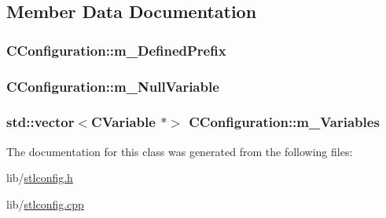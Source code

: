 \subsection{Member Data Documentation}
\hypertarget{classCConfiguration_a85333335417a9d19030b03273562adee}{
\subsubsection[{m\-\_\-\-Defined\-Prefix}]{ C\-Configuration\-::m\-\_\-\-Defined\-Prefix\hspace{0.3cm}{\ttfamily [protected]}}}\label{classCConfiguration_a85333335417a9d19030b03273562adee}
\hypertarget{classCConfiguration_a3e379beeb1a6795eaf95740a0054f215}{
\subsubsection[{m\-\_\-\-Null\-Variable}]{ C\-Configuration\-::m\-\_\-\-Null\-Variable\hspace{0.3cm}{\ttfamily [protected]}}}\label{classCConfiguration_a3e379beeb1a6795eaf95740a0054f215}
\hypertarget{classCConfiguration_ab55474edc9916f3e057ca0019be734c2}{
\subsubsection[{m\-\_\-\-Variables}]{\setlength{\rightskip}{0pt plus 5cm}std\-::vector$<${\bf C\-Variable} $\ast$$>$ C\-Configuration\-::m\-\_\-\-Variables\hspace{0.3cm}{\ttfamily [protected]}}}\label{classCConfiguration_ab55474edc9916f3e057ca0019be734c2}


The documentation for this class was generated from the following files\-:\begin{DoxyCompactItemize}
\item 
lib/\hyperlink{stlconfig_8h}{stlconfig.\-h}\item 
lib/\hyperlink{stlconfig_8cpp}{stlconfig.\-cpp}\end{DoxyCompactItemize}
